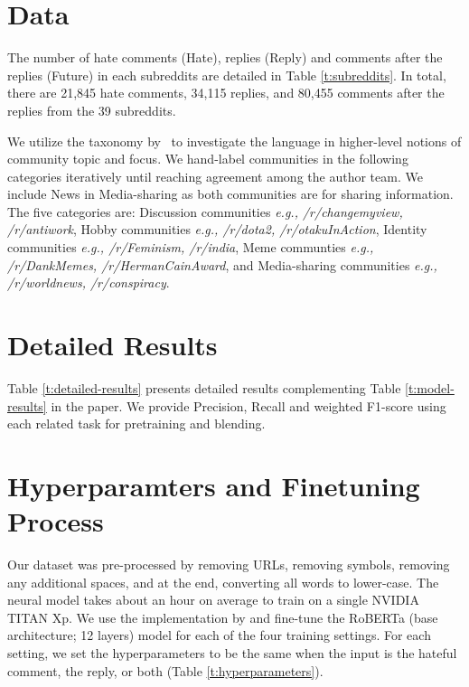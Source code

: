 \documentclass[11pt]{article}
\begin{document}
	
	\section{Data}
	\label{sec:appendix_data}
	The number of hate comments (Hate), replies (Reply) and comments after the replies (Future) in each subreddits are detailed in Table \ref{t:subreddits}. 
	In total, there are 21,845 hate comments, 34,115 replies, and 80,455 comments after the replies from the 39 subreddits.
	
	We utilize the taxonomy by~\citet{Weld_Zhang_Althoff_2022} to investigate the language in higher-level notions of community topic and focus. 
	We hand-label communities in the following categories iteratively until reaching agreement among the author team. 
	We include News in Media-sharing as both communities are for sharing information.
	The five categories are: Discussion communities \emph{e.g., /r/changemyview, /r/antiwork}, Hobby communities \emph{e.g., /r/dota2, /r/otakuInAction}, Identity communities \emph{e.g., /r/Feminism, /r/india}, Meme communties \emph{e.g., /r/DankMemes, /r/HermanCainAward}, and Media-sharing communities \emph{e.g., /r/worldnews, /r/conspiracy}.
	
	
	
	
	\section{Detailed Results}
	\label{sec:appendix_results}
	Table \ref{t:detailed-results} presents detailed results complementing Table \ref{t:model-results} in the paper. 
	We provide Precision, Recall and weighted F1-score using each related task for pretraining and blending.
	
	
	\section{Hyperparamters and Finetuning Process}
	\label{sec:appendix_hyper}
	
	Our dataset was pre-processed by removing URLs, removing symbols, removing any additional spaces, and at the end, converting all words to lower-case. 
	The neural model takes about an hour on average to train on a single NVIDIA TITAN Xp. 
	We use the implementation by \citet{phang2020jiant} and fine-tune the RoBERTa (base architecture; 12 layers) \cite{DBLP:journals/corr/abs-1907-11692} model for each of the four training settings. 
	For each setting, we set the hyperparameters to be the same when the input is the hateful comment, the reply, or both (Table \ref{t:hyperparameters}).
	
\end{document}
